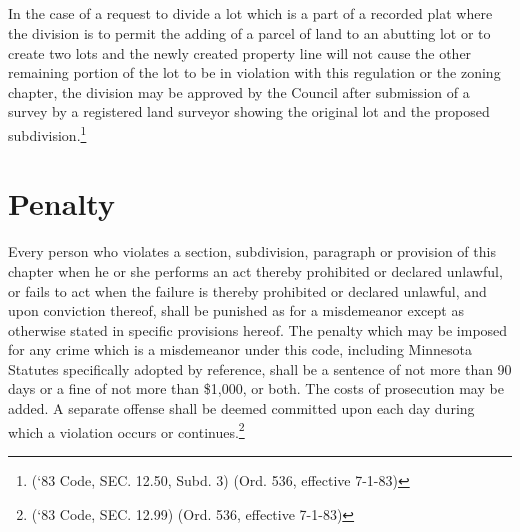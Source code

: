 \subsection{}
In the case of a request to divide a lot which is a part of a recorded plat where the division is to permit the adding of a parcel of land to an abutting lot or to create two lots and the newly created property line will not cause the other remaining portion of the lot to be in violation with this regulation or the zoning chapter, the division may be approved by the Council after submission of a survey by a registered land surveyor showing the original lot and the proposed subdivision.\footnote{(‘83 Code, SEC. 12.50, Subd. 3)  (Ord. 536, effective 7-1-83)}

\setcounter{section}{98}
\section{Penalty}
Every person who violates a section, subdivision, paragraph or provision of this chapter when he or she performs an act thereby prohibited or declared unlawful, or fails to act when the failure is thereby prohibited or declared unlawful, and upon conviction thereof, shall be punished as for a misdemeanor except as otherwise stated in specific provisions hereof. The penalty which may be imposed for any crime which is a misdemeanor under this code, including Minnesota Statutes specifically adopted by reference, shall be a sentence of not more than 90 days or a fine of not more than \$1,000, or both. The costs of prosecution may be added. A separate offense shall be deemed committed upon each day during which a violation occurs or continues.\footnote{(‘83 Code, SEC. 12.99)  (Ord. 536, effective 7-1-83)}
